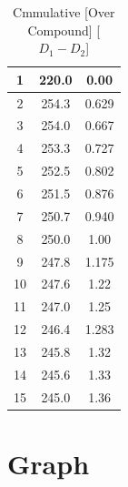 \documentclass[a4paper,12pt]{article}
\begin{document}
\begin{table}[H]
\begin{subtable}[t]{0.45\textwidth}
\begin{tabular}{|c|c|c|}
			
			1                                                         & 220.0       & 0.00       \\ \hline
			2                                                         & 254.3       & 0.629       \\ \hline
			3                                                         & 254.0       & 0.667       \\ \hline
			4                                                         & 253.3       & 0.727       \\ \hline
			5                                                         & 252.5       & 0.802       \\ \hline
			6                                                         & 251.5       & 0.876       \\ \hline
			7                                                         & 250.7       & 0.940       \\ \hline
			8                                                         & 250.0         & 1.00        \\ \hline
			9                                                         & 247.8       & 1.175       \\ \hline
			10                                                         & 247.6       & 1.22        \\ \hline
			11                                                        & 247.0       & 1.25        \\ \hline
			12                                                        & 246.4       & 1.283       \\ \hline
			13                                                        & 245.8       & 1.32        \\ \hline
			14                                                        & 245.6       & 1.33        \\ \hline
			15                                                        & 245.0         & 1.36        \\ \hline
		\end{tabular}
		\caption{Cmmulative [Over Compound] [$D_1-D_2$] }
		\end{subtable}
	\end{table}
	\section{Graph}
	
\end{document}
